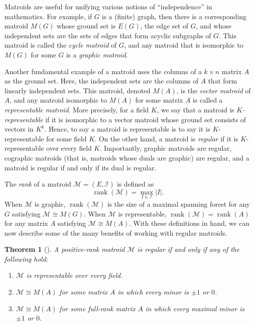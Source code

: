 \documentclass{amsart}
\numberwithin{equation}{section}
\theoremstyle{plain}
\newtheorem{thm}{Theorem}[section]
\theoremstyle{definition}
\DeclareMathOperator{\rk}{rank}
\newcommand{\calI}{\mathcal{I}}
\newcommand{\calM}{\mathcal{M}}
\begin{document}
Matroids are useful for unifying various notions of ``independence'' in mathematics.
For example, if $G$ is a (finite) graph, then there is a corresponding matroid $M(G)$ whose ground set is $E(G)$, the edge set of $G$, and whose independent sets are the sets of edges that form acyclic subgraphs of $G$.
This matroid is called the \emph{cycle matroid} of $G$, and any matroid that is isomorphic to $M(G)$ for some $G$ is a \emph{graphic matroid}.

Another fundamental example of a matroid uses the columns of a $k \times n$ matrix $A$ as the ground set.
Here, the independent sets are the columns of $A$ that form linearly independent sets.
This matroid, denoted $M(A)$, is the \emph{vector matroid} of $A$, and any matroid isomorphic to $M(A)$ for some matrix $A$ is called a \emph{representable matroid}.
More precisely, for a field $K$, we say that a matroid is \emph{$K$-representable} if it is isomorphic to a vector matroid whose ground set consists of vectors in $K^k$.
Hence, to say a matroid is representable is to say it is $K$-representable for some field $K$.
On the other hand, a matroid is \emph{regular} if it is $K$-representable over every field $K$.
Importantly, graphic matroids are regular, cographic matroids (that is, matroids whose duals are graphic) are regular, and a matroid is regular if and only if its dual is regular. 

The \emph{rank} of a matroid $\calM = (E,\calI)$ is defined as 
\[
    \rk(\calM) = \max_{I \in \calI} |I|.
\]
When $\calM$ is graphic, $\rk(\calM)$ is the size of a maximal spanning forest for any $G$ satisfying $\calM \cong M(G)$.
When $\calM$ is representable, $\rk(\calM) = \rk(A)$ for any matrix $A$ satisfying $\calM \cong M(A)$.
With these definitions in hand, we can now describe some of the many benefits of working with regular matroids.

\begin{thm}[{\cite[Definition/Theorem 2.3]{DJKK}}]\label{thm:defthm}
    A positive-rank matroid $\calM$ is regular if and only if any of the following hold:
    \begin{enumerate}[label={\rm (\roman*)}]
        \item $\calM$ is representable over every field.
        \item $\calM \cong M(A)$ for some matrix $A$ in which every minor is $\pm 1$ or $0$.
        \item $\calM \cong M(A)$ for some full-rank matrix $A$ in which every maximal minor is $\pm 1$ or $0$.
    \end{enumerate}
\end{thm}
\end{document}

